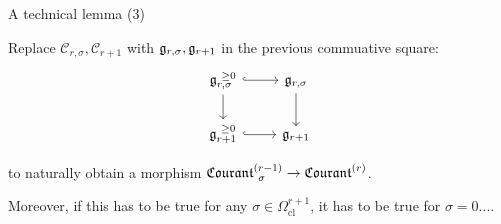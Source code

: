 \documentclass[beamer,10pt]{standalone}
\begin{document}
\begin{frame}{A technical lemma (3)}
	\begin{upshotblock}
	  Replace $\mathcal{C}_{r,\sigma}, \mathcal{C}_{r+1}$ with $\g_{r,\sigma}, \g_{r+1}$ in the previous commuative square:
		\begin{displaymath}
			\begin{tikzcd}[ampersand replacement=\&]
				\g_{r,\sigma}^{~\geq 0} \ar[r,hook] \ar[d, ]
				\& \g_{r,\sigma} \ar[d, ]
				\\
				\g_{r+1}^{~\geq 0} \ar[r,hook] \& \g_{r+1}
			\end{tikzcd}
		\end{displaymath}
		\medskip

		to naturally obtain a morphism $\Courant[\sigma]{r-1} \to \Courant{r}$.
	\end{upshotblock}
	\vfill

	Moreover, if this has to be true for any $\sigma \in \Omega^{r+1}_{\mathrm{cl}}$, it has to be true for $\sigma = 0$.... 
\end{frame}
\end{document}
